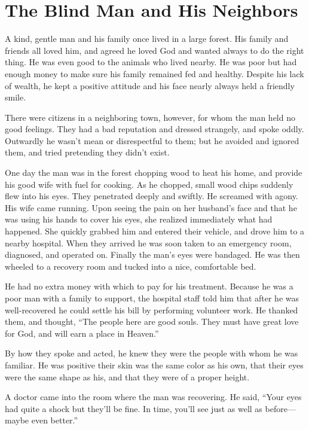 \chapter{The Blind Man and His Neighbors}

A kind, gentle man and his family once lived in a large forest. His family and friends all loved him, and agreed he loved God and wanted always to do the right thing. He was even good to the animals who lived nearby. He was poor but had enough money to make sure his family remained fed and healthy. Despite his lack of wealth, he kept a positive attitude and his face nearly always held a friendly smile.

There were citizens in a neighboring town, however, for whom the man held no good feelings. They had a bad reputation and dressed strangely, and spoke oddly. Outwardly he wasn't mean or disrespectful to them; but he avoided and ignored them, and tried pretending they didn't exist.

One day the man was in the forest chopping wood to heat his home, and provide his good wife with fuel for cooking. As he chopped, small wood chips suddenly flew into his eyes. They penetrated deeply and swiftly. He screamed with agony. His wife came running. Upon seeing the pain on her husband's face and that he was using his hands to cover his eyes, she realized immediately what had happened. She quickly grabbed him and entered their vehicle, and drove him to a nearby hospital. When they arrived he was soon taken to an emergency room, diagnosed, and operated on. Finally the man's eyes were bandaged. He was then wheeled to a recovery room and tucked into a nice, comfortable bed.

He had no extra money with which to pay for his treatment. Because he was a poor man with a family to support, the hospital staff told him that after he was well-recovered he could settle his bill by performing volunteer work. He thanked them, and thought, “The people here are good souls. They must have great love for God, and will earn a place in Heaven.”

By how they spoke and acted, he knew they were the people with whom he was familiar. He was positive their skin was the same color as his own, that their eyes were the same shape as his, and that they were of a proper height.

A doctor came into the room where the man was recovering. He said, “Your eyes had quite a shock but they'll be fine. In time, you'll see just as well as before—maybe even better.”

